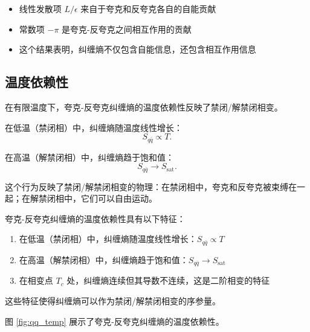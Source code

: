 \begin{remark}[物理解释]
\begin{itemize}
    \item 线性发散项 $L/\epsilon$ 来自于夸克和反夸克各自的自能贡献
    \item 常数项 $-\pi$ 是夸克-反夸克之间相互作用的贡献
    \item 这个结果表明，纠缠熵不仅包含自能信息，还包含相互作用信息
\end{itemize}
\end{remark}

\subsection{温度依赖性}

在有限温度下，夸克-反夸克纠缠熵的温度依赖性反映了禁闭/解禁闭相变。

在低温（禁闭相）中，纠缠熵随温度线性增长：
\begin{equation}
    S_{q\bar{q}} \propto T.
\end{equation}

在高温（解禁闭相）中，纠缠熵趋于饱和值：
\begin{equation}
    S_{q\bar{q}} \to S_{\text{sat}}.
\end{equation}

这个行为反映了禁闭/解禁闭相变的物理：在禁闭相中，夸克和反夸克被束缚在一起；在解禁闭相中，它们可以自由运动。

\begin{property}[纠缠熵的温度依赖性]
夸克-反夸克纠缠熵的温度依赖性具有以下特征：
\begin{enumerate}
    \item 在低温（禁闭相）中，纠缠熵随温度线性增长：$S_{q\bar{q}} \propto T$
    \item 在高温（解禁闭相）中，纠缠熵趋于饱和值：$S_{q\bar{q}} \to S_{\text{sat}}$
    \item 在相变点 $T_c$ 处，纠缠熵连续但其导数不连续，这是二阶相变的特征
\end{enumerate}
这些特征使得纠缠熵可以作为禁闭/解禁闭相变的序参量。
\end{property}

图 \ref{fig:qq_temp} 展示了夸克-反夸克纠缠熵的温度依赖性。

